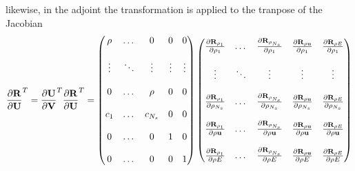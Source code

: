 likewise, in the adjoint the transformation is applied to the tranpose of the 
Jacobian
\begin{equation}
  \begin{aligned}
    \frac{\partial \mathbf R}{\partial \mathbf U}^{T} = \frac{\partial \mathbf U}{\partial \mathbf V}^{T} \frac{\partial \mathbf R}{\partial \mathbf U}^{T} =
    \begin{pmatrix}
      \rho   & \dots  & 0      &  0      & 0      \\ \\
      \vdots & \ddots & \vdots &  \vdots & \vdots \\ \\
      0      & \dots  &\rho    &  0      & 0      \\ \\
      c_1    & \dots  & c_{N_s} &  0      & 0      \\ \\
      0      & \dots  & 0      &  1      & 0      \\ \\
      0      & \dots  & 0      &  0      & 1
    \end{pmatrix}
    \begin{pmatrix}
      \frac{\partial \mathbf R_{\rho_1}}{\partial \rho_1}    & \dots  & \frac{\partial \mathbf R_{\rho_{N_s}}}{\partial \rho_1}    & \frac{\partial \mathbf R_{\rho \mathbf u}}{\partial \rho_1}    & \frac{\partial \mathbf R_{\rho E}}{\partial \rho_1} \\ \\
      \vdots                    & \ddots & \vdots                       & \vdots                      & \vdots                   \\ \\
      \frac{\partial \mathbf R_{\rho_1}}{\partial \rho_{N_s}} & \dots  & \frac{\partial \mathbf R_{\rho_{N_s}}}{\partial \rho_{N_s}} & \frac{\partial \mathbf R_{\rho \mathbf u}}{\partial \rho_{N_s}} & \frac{\partial \mathbf R_{\rho E}}{\partial \rho_{N_s}} \\ \\
      \frac{\partial \mathbf R_{\rho_1}}{\partial \rho \mathbf u}  & \dots  & \frac{\partial \mathbf R_{\rho_{N_s}}}{\partial \rho \mathbf u}  & \frac{\partial \mathbf R_{\rho \mathbf u}}{\partial \rho \mathbf u}  & \frac{\partial \mathbf R_{\rho E}}{\partial \rho \mathbf u} \\ \\
      \frac{\partial \mathbf R_{\rho_1}}{\partial \rho E}    & \dots  & \frac{\partial \mathbf R_{\rho_{N_s}}}{\partial \rho E}    & \frac{\partial \mathbf R_{\rho \mathbf u}}{\partial \rho E}    & \frac{\partial \mathbf R_{\rho E}}{\partial \rho E}
    \end{pmatrix}
  \end{aligned}
  \label{drdu-to-drdv-t}
\end{equation}
